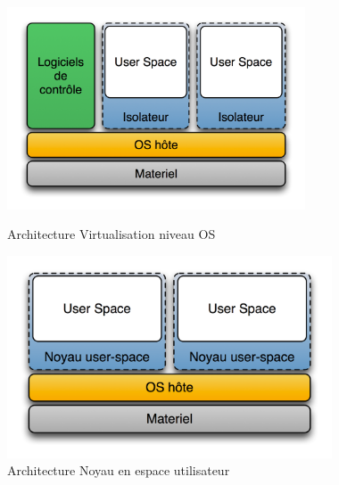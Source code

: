 \newcommand{\hauteurgraphiques}{6cm}
\begin{figure}[ht!]
    \begin{minipage}{0.49\textwidth}
        \centering
        \includegraphics[width=1\linewidth,height=\hauteurgraphiques]{fig1/virtualisation_niveau_os.png}
        \caption{Architecture Virtualisation niveau OS}
        \label{fig:virtualisation_niveau_os}
    \end{minipage}
    \hspace{\fill}
    \begin{minipage}{0.49\textwidth}
        \centering
        \includegraphics[width=1\linewidth,height=\hauteurgraphiques]{fig1/noyau_espace_utilisateur.png}
        \caption{Architecture Noyau en espace utilisateur}
        \label{fig:noyau_espace_utilisateur}
    \end{minipage}
    \begin{minipage}{0.49\textwidth}

\end{minipage}
\end{figure}
